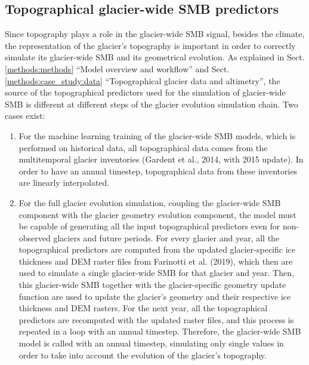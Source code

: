 \subsection{Topographical glacier-wide SMB predictors}

Since topography plays a role in the glacier-wide SMB signal, besides the climate, the representation of the glacier’s topography is important in order to correctly simulate its glacier-wide SMB and its geometrical evolution. As explained in Sect. \ref{methods:methods} “Model overview and workflow” and Sect. \ref{methods:case_study:data} “Topographical glacier data and altimetry”, the source of the topographical predictors used for the simulation of glacier-wide SMB is different at different steps of the glacier evolution simulation chain. Two cases exist:

\begin{enumerate}
 
\item For the machine learning training of the glacier-wide SMB models, which is performed on historical data, all topographical data comes from the multitemporal glacier inventories (Gardent et al., 2014, with 2015 update). In order to have an annual timestep, topographical data from these inventories are linearly interpolated. 
\item For the full glacier evolution simulation, coupling the glacier-wide SMB component with the glacier geometry evolution component, the model must be capable of generating all the input topographical predictors even for non-observed glaciers and future periods. For every glacier and year, all the topographical predictors are computed from the updated glacier-specific ice thickness and DEM raster files from Farinotti et al. (2019), which then are used to simulate a single glacier-wide SMB for that glacier and year. Then, this glacier-wide SMB together with the glacier-specific geometry update function are used to update the glacier’s geometry and their respective ice thickness and DEM rasters. For the next year, all the topographical predictors are recomputed with the updated raster files, and this process is repeated in a loop with an annual timestep. Therefore, the glacier-wide SMB model is called with an annual timestep, simulating only single values in order to take into account the evolution of the glacier’s topography. 

\end{enumerate}

